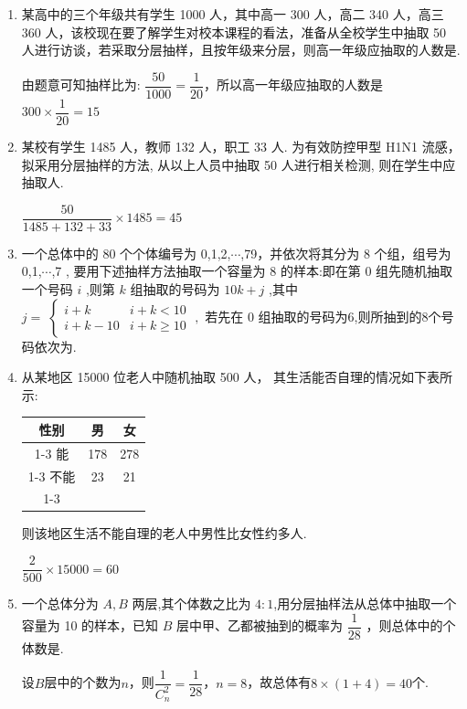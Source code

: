 \begin{enumerate}
    \item 某高中的三个年级共有学生 1000 人，其中高一 300 人，高二 340 人，高三 360 人，该校现在要了解学生对校本课程的看法，准备从全校学生中抽取 50 人进行访谈，若采取分层抽样，且按年级来分层，则高一年级应抽取的人数是.
    \begin{jieda}
        由题意可知抽样比为: $\dfrac{50}{1000} = \dfrac{1}{20}$，所以高一年级应抽取的人数是 ${300} \times  \dfrac{1}{20} = {15}$
    \end{jieda}

    \item 某校有学生 1485 人，教师 132 人，职工 33 人. 为有效防控甲型 H1N1 流感， 拟采用分层抽样的方法, 从以上人员中抽取 50 人进行相关检测, 则在学生中应抽取人.
    \begin{jieda}
        $\dfrac{50}{1485+132+33} \times 1485 = 45$
    \end{jieda}

    \item 一个总体中的 80 个个体编号为 0,1,2,$\cdots$,79，并依次将其分为 8 个组，组号为 0,1,$\cdots$,7 , 要用下述抽样方法抽取一个容量为 8 的样本:即在第 0 组先随机抽取一个号码 $i$ ,则第 $k$ 组抽取的号码为 ${10k} + j$ ,其中 $j = \; \left\{  {\begin{array}{ll} i + k & i + k < {10} \\  i + k - {10} & i + k \geq  {10} \end{array}\;,\text{ 若先在 }0}\right.$ 组抽取的号码为6,则所抽到的8个号码依次为.

    \item 从某地区 15000 位老人中随机抽取 500 人， 其生活能否自理的情况如下表所示:
    
    \begin{center}
    \begin{tabular}{|c|c|c|}
    \hline
    性别 & 男 & 女 \\
    \cline{1-3}
    能 & 178 & 278 \\
    \cline{1-3}
    不能 & 23 & 21 \\
    \cline{1-3}
    \hline
    \end{tabular}
    \end{center}
    
    则该地区生活不能自理的老人中男性比女性约多人.
    \begin{jieda}
        $\dfrac{2}{500} \times 15000 = 60$
    \end{jieda}

    \item 一个总体分为 $A,B$ 两层,其个体数之比为 $4:1$,用分层抽样法从总体中抽取一个容量为 10 的样本，已知 $B$ 层中甲、乙都被抽到的概率为 $\dfrac{1}{28}$ ，则总体中的个体数是.
    \begin{jieda}
        设$B$层中的个数为$n$，则$\dfrac{1}{C_n^2} = \dfrac{1}{28}$，$n = 8$，故总体有$8 \times (1+4) = 40$个.
    \end{jieda}


\end{enumerate}
